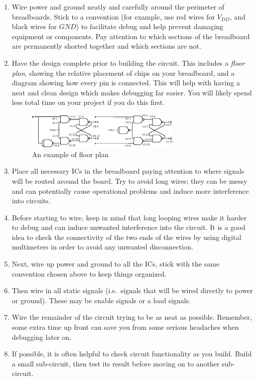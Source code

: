 \documentclass[12pt, logo=tehranDLDL/ut]{tehranDLDL}
\begin{document}
\begin{enumerate}
    \item Wire power and ground neatly and carefully around the perimeter of breadboards. Stick to a convention (for example, use red wires for $V_\mathit{DD}$, and black wires for $\mathit{GND}$) to facilitate debug and help prevent damaging equipment or components. Pay attention to which sections of the breadboard are permanently shorted together and which sections are not.
    \item Have the design complete prior to building the circuit. This includes a \textit{floor plan}, showing the relative placement of chips on your breadboard, and a diagram showing how every pin is connected. This will help with having a neat and clean design which makes debugging far easier. You will likely spend less total time on your project if you do this first.
    \begin{figure}
        \centering
        \caption{An example of floor plan\label{fig:floorplan}}
        \includegraphics[width=0.7\textwidth]{floorplan.png}
    \end{figure}
    \item Place all necessary ICs in the breadboard paying attention to where signals will be routed around the board. Try to avoid long wires; they can be messy and can potentially cause operational problems and induce more interference into circuits.
    \item Before starting to wire, keep in mind that long looping wires make it harder to debug and can induce unwanted interference into the circuit. It is a good idea to check the connectivity of the two ends of the wires by using digital multimeters in order to avoid any unwanted disconnection. 
    \item Next, wire up power and ground to all the ICs, stick with the same convention chosen above to keep things organized.
    \item Then wire in all static signals (i.e.\ signals that will be wired directly to power or ground). These may be enable signals or a load signals.
    \item Wire the remainder of the circuit trying to be as neat as possible. Remember, some extra time up front can save you from some serious headaches when debugging later on.
    \item If possible, it is often helpful to check circuit functionality as you build. Build a small sub-circuit, then test its result before moving on to another sub-circuit.
\end{enumerate}
\end{document}
